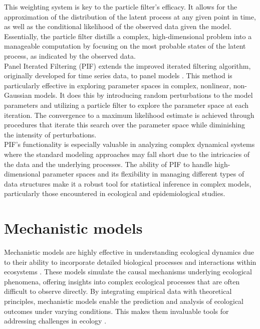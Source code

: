 \documentclass[12pt]{article}
\begin{document}
This weighting system is key to the particle filter's efficacy. It allows for the approximation of the distribution of the latent process at any given point in time, as well as the conditional likelihood of the observed data given the model. Essentially, the particle filter distills a complex, high-dimensional problem into a manageable computation by focusing on the most probable states of the latent process, as indicated by the observed data.\\

Panel Iterated Filtering (PIF) extends the improved iterated filtering algorithm, originally developed for time series data, to panel models \citep{Carles2020}. This method is particularly effective in exploring parameter spaces in complex, nonlinear, non-Gaussian models.  It does this by introducing random perturbations to the model parameters and utilizing a particle filter to explore the parameter space at each iteration. The convergence to a maximum likelihood estimate is achieved through procedures that iterate this search over the parameter space while diminishing the intensity of perturbations.\\

PIF's functionality is especially valuable in analyzing complex dynamical systems where the standard modeling approaches may fall short due to the intricacies of the data and the underlying processes. The ability of PIF to handle high-dimensional parameter spaces and its flexibility in managing different types of data structures make it a robust tool for statistical inference in complex models, particularly those encountered in ecological and epidemiological studies.\\

\section{Mechanistic models}
\label{sec:mecmod}
Mechanistic models are highly effective in understanding ecological dynamics due to their ability to incorporate detailed biological processes and interactions within ecosystems \citep{young1998data}. These models simulate the causal mechanisms underlying ecological phenomena, offering insights into complex ecological processes that are often difficult to observe directly. By integrating empirical data with theoretical principles, mechanistic models enable the prediction and analysis of ecological outcomes under varying conditions. This makes them invaluable tools for addressing challenges in ecology \citep{mouquet2015predictive}.\\
\end{document}
